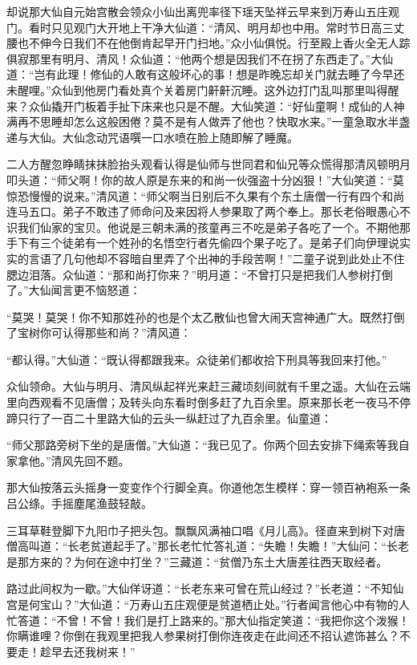 \documentclass[12pt,UTF8]{ctexbook}
\begin{document}
却说那大仙自元始宫散会领众小仙出离兜率径下瑶天坠祥云早来到万寿山五庄观门。看时只见观门大开地上干净大仙道：“清风、明月却也中用。常时节日高三丈腰也不伸今日我们不在他倒肯起早开门扫地。”众小仙俱悦。行至殿上香火全无人踪俱寂那里有明月、清风！众仙道：“他两个想是因我们不在拐了东西走了。”大仙道：“岂有此理！修仙的人敢有这般坏心的事！想是昨晚忘却关门就去睡了今早还未醒哩。”众仙到他房门看处真个关着房门鼾鼾沉睡。这外边打门乱叫那里叫得醒来？众仙撬开门板着手扯下床来也只是不醒。大仙笑道：“好仙童啊！成仙的人神满再不思睡却怎么这般困倦？莫不是有人做弄了他也？快取水来。”一童急取水半盏递与大仙。大仙念动咒语噀一口水喷在脸上随即解了睡魔。

二人方醒忽睁睛抹抹脸抬头观看认得是仙师与世同君和仙兄等众慌得那清风顿明月叩头道：“师父啊！你的故人原是东来的和尚一伙强盗十分凶狠！”大仙笑道：“莫惊恐慢慢的说来。”清风道：“师父啊当日别后不久果有个东土唐僧一行有四个和尚连马五口。弟子不敢违了师命问及来因将人参果取了两个奉上。那长老俗眼愚心不识我们仙家的宝贝。他说是三朝未满的孩童再三不吃是弟子各吃了一个。不期他那手下有三个徒弟有一个姓孙的名悟空行者先偷四个果子吃了。是弟子们向伊理说实实的言语了几句他却不容暗自里弄了个出神的手段苦啊！”二童子说到此处止不住腮边泪落。众仙道：“那和尚打你来？”明月道：“不曾打只是把我们人参树打倒了。”大仙闻言更不恼怒道：

“莫哭！莫哭！你不知那姓孙的也是个太乙散仙也曾大闹天宫神通广大。既然打倒了宝树你可认得那些和尚？”清风道：

“都认得。”大仙道：“既认得都跟我来。众徒弟们都收拾下刑具等我回来打他。”

众仙领命。大仙与明月、清风纵起祥光来赶三藏顷刻间就有千里之遥。大仙在云端里向西观看不见唐僧；及转头向东看时倒多赶了九百余里。原来那长老一夜马不停蹄只行了一百二十里路大仙的云头一纵赶过了九百余里。仙童道：

“师父那路旁树下坐的是唐僧。”大仙道：“我已见了。你两个回去安排下绳索等我自家拿他。”清风先回不题。

那大仙按落云头摇身一变变作个行脚全真。你道他怎生模样：穿一领百衲袍系一条吕公绦。手摇塵尾渔鼓轻敲。

三耳草鞋登脚下九阳巾子把头包。飘飘风满袖口唱《月儿高》。径直来到树下对唐僧高叫道：“长老贫道起手了。”那长老忙忙答礼道：“失瞻！失瞻！”大仙问：“长老是那方来的？为何在途中打坐？”三藏道：“贫僧乃东土大唐差往西天取经者。

路过此间权为一歇。”大仙佯讶道：“长老东来可曾在荒山经过？”长老道：“不知仙宫是何宝山？”大仙道：“万寿山五庄观便是贫道栖止处。”行者闻言他心中有物的人忙答道：“不曾！不曾！我们是打上路来的。”那大仙指定笑道：“我把你这个泼猴！你瞒谁哩？你倒在我观里把我人参果树打倒你连夜走在此间还不招认遮饰甚么？不要走！趁早去还我树来！”
\end{document}

